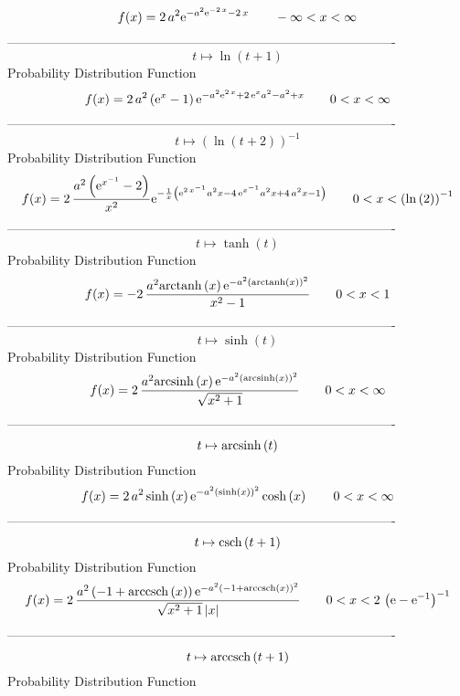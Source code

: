 \documentclass[12pt]{article}
\begin{document}
$$  f(x)=2\,{a}^{2}{{\rm e}^{-{a}^{2}{{\rm e}^{-2\,x}}-2\,x}}
 \qquad-\infty 
 < x < \infty 
$$-------------------------------------------------------------------------------------------  \\$$t\mapsto \ln  \left( t+1 \right) 
$$Probability Distribution Function 
$$  f(x)=2\,{a}^{2} \left( {{\rm e}^{x}}-1 \right) {{\rm e}^{-{a}^{2}{{\rm e}^{
2\,x}}+2\,{{\rm e}^{x}}{a}^{2}-{a}^{2}+x}}
 \qquad0
 < x < \infty 
$$-------------------------------------------------------------------------------------------  \\$$t\mapsto  \left( \ln  \left( t+2 \right)  \right) ^{-1}
$$Probability Distribution Function 
$$  f(x)=2\,{\frac {{a}^{2} \left( {{\rm e}^{{x}^{-1}}}-2 \right) }{{x}^{2}}{
{\rm e}^{-{\frac {1}{x} \left( {{\rm e}^{2\,{x}^{-1}}}{a}^{2}x-4\,{
{\rm e}^{{x}^{-1}}}{a}^{2}x+4\,{a}^{2}x-1 \right) }}}}
 \qquad0
 < x <  \left( \ln  \left( 2 \right)  \right) ^{-1}
$$-------------------------------------------------------------------------------------------  \\$$t\mapsto \tanh \left( t \right) 
$$Probability Distribution Function 
$$  f(x)=-2\,{\frac {{a}^{2}{\rm arctanh} \left(x\right){{\rm e}^{-{a}^{2}
 \left( {\rm arctanh} \left(x\right) \right) ^{2}}}}{{x}^{2}-1}}
 \qquad0
 < x < 1
$$-------------------------------------------------------------------------------------------  \\$$t\mapsto \sinh \left( t \right) 
$$Probability Distribution Function 
$$  f(x)=2\,{\frac {{a}^{2}{\rm arcsinh} \left(x\right){{\rm e}^{-{a}^{2}
 \left( {\rm arcsinh} \left(x\right) \right) ^{2}}}}{\sqrt {{x}^{2}+1}
}}
 \qquad0
 < x < \infty 
$$-------------------------------------------------------------------------------------------  \\$$t\mapsto {\rm arcsinh} \left(t\right)
$$Probability Distribution Function 
$$  f(x)=2\,{a}^{2}\sinh \left( x \right) {{\rm e}^{-{a}^{2} \left( \sinh
 \left( x \right)  \right) ^{2}}}\cosh \left( x \right) 
 \qquad0
 < x < \infty 
$$-------------------------------------------------------------------------------------------  \\$$t\mapsto {\rm csch} \left(t+1\right)
$$Probability Distribution Function 
$$  f(x)=2\,{\frac {{a}^{2} \left( -1+{\rm arccsch} \left(x\right) \right) {
{\rm e}^{-{a}^{2} \left( -1+{\rm arccsch} \left(x\right) \right) ^{2}}
}}{\sqrt {{x}^{2}+1} \left| x \right| }}
 \qquad0
 < x < 2\, \left( {\rm e}-{{\rm e}^{-1}} \right) ^{-1}
$$-------------------------------------------------------------------------------------------  \\$$t\mapsto {\rm arccsch} \left(t+1\right)
$$Probability Distribution Function 
\end{document}
